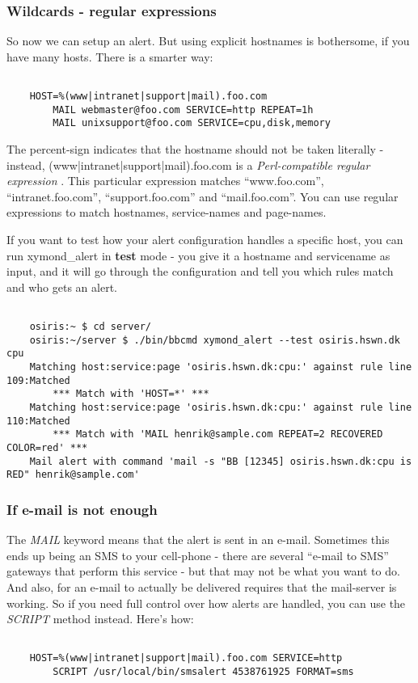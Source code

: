 \subsubsection{Wildcards - regular expressions}


 So now we can setup an alert. But using explicit hostnames is bothersome, if you have many hosts. There is a smarter way: \begin{verbatim}

	HOST=%(www|intranet|support|mail).foo.com
		MAIL webmaster@foo.com SERVICE=http REPEAT=1h
		MAIL unixsupport@foo.com SERVICE=cpu,disk,memory

\end{verbatim}



 The percent-sign indicates that the hostname should not be taken literally - instead, (www|intranet|support|mail).foo.com is a \emph{Perl-compatible regular expression}
. This particular expression matches ``www.foo.com'', ``intranet.foo.com'', ``support.foo.com'' and ``mail.foo.com''. You can use regular expressions to match hostnames, service-names and page-names.


 If you want to test how your alert configuration handles a specific host, you can run xymond\_alert in \textbf{test}
 mode - you give it a hostname and servicename as input, and it will go through the configuration and tell you which rules match and who gets an alert.
\begin{verbatim}

	osiris:~ $ cd server/
	osiris:~/server $ ./bin/bbcmd xymond_alert --test osiris.hswn.dk cpu
	Matching host:service:page 'osiris.hswn.dk:cpu:' against rule line 109:Matched
	    *** Match with 'HOST=*' ***
	Matching host:service:page 'osiris.hswn.dk:cpu:' against rule line 110:Matched
	    *** Match with 'MAIL henrik@sample.com REPEAT=2 RECOVERED COLOR=red' ***
	Mail alert with command 'mail -s "BB [12345] osiris.hswn.dk:cpu is RED" henrik@sample.com'

\end{verbatim}
\subsubsection{If e-mail is not enough}


 The \emph{MAIL}
 keyword means that the alert is sent in an e-mail. Sometimes this ends up being an SMS to your cell-phone - there are several ``e-mail to SMS'' gateways that perform this service - but that may not be what you want to do. And also, for an e-mail to actually be delivered requires that the mail-server is working. So if you need full control over how alerts are handled, you can use the \emph{SCRIPT}
 method instead. Here's how: \begin{verbatim}

	HOST=%(www|intranet|support|mail).foo.com SERVICE=http
		SCRIPT /usr/local/bin/smsalert 4538761925 FORMAT=sms

\end{verbatim}



